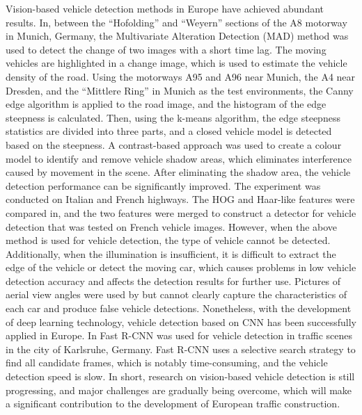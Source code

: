 Vision-based vehicle detection methods in Europe have achieved abundant results. In, between the “Hofolding” and “Weyern” sections of the A8 motorway in Munich, Germany, the Multivariate Alteration Detection (MAD) method was used to detect the change of two images with a short time lag. The moving vehicles are highlighted in a change image, which is used to estimate the vehicle density of the road. Using the motorways A95 and A96 near Munich, the A4 near Dresden, and the “Mittlere Ring” in Munich as the test environments, the Canny edge algorithm is applied to the road image, and the histogram of the edge steepness is calculated. Then, using the k-means algorithm, the edge steepness statistics are divided into three parts, and a closed vehicle model is detected based on the steepness. A contrast-based approach was used to create a colour model to identify and remove vehicle shadow areas, which eliminates interference caused by movement in the scene. After eliminating the shadow area, the vehicle detection performance can be significantly improved. The experiment was conducted on Italian and French highways. The HOG and Haar-like features were compared in, and the two features were merged to construct a detector for vehicle detection that was tested on French vehicle images. However, when the above method is used for vehicle detection, the type of vehicle cannot be detected. Additionally, when the illumination is insufficient, it is difficult to extract the edge of the vehicle or detect the moving car, which causes problems in low vehicle detection accuracy and affects the detection results for further use. Pictures of aerial view angles were used by but cannot clearly capture the characteristics of each car and produce false vehicle detections.
Nonetheless, with the development of deep learning technology, vehicle detection based on CNN has been successfully applied in Europe. In Fast R-CNN was used for vehicle detection in traffic scenes in the city of Karlsruhe, Germany. Fast R-CNN uses a selective search strategy to find all candidate frames, which is notably time-consuming, and the vehicle detection speed is slow.
In short, research on vision-based vehicle detection is still progressing, and major challenges are gradually being overcome, which will make a significant contribution to the development of European traffic construction.


